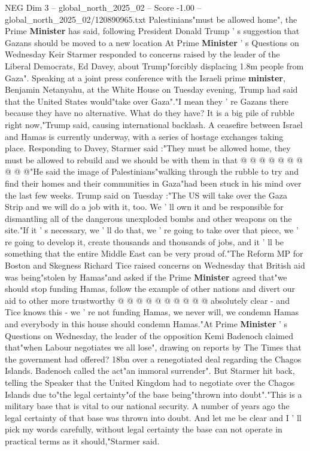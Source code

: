 \begin{textsample}{NEG Dim 3 – global\_north\_2025\_02 – Score -1.00 – global\_north\_2025\_02/120890965.txt}  \label{ex:f3_neg_168}
Palestinians"must be allowed home", the Prime \textbf{Minister} has said, following President Donald Trump ' s suggestion that Gazans should be moved to a new location At Prime \textbf{Minister} ' s Questions on Wednesday Keir Starmer responded to concerns raised by the leader of the Liberal Democrats, Ed Davey, about Trump"forcibly displacing 1.8m people from Gaza".
Speaking at a joint press conference with the Israeli prime \textbf{minister}, Benjamin Netanyahu, at the White House on Tuesday evening, Trump had said that the United States would"take over Gaza"."I mean they ' re Gazans there because they have no alternative.
What do they have?
It is a big pile of rubble right now,"Trump said, causing international backlash.
A ceasefire between Israel and Hamas is currently underway, with a series of hostage exchanges taking place.
Responding to Davey, Starmer said :"They must be allowed home, they must be allowed to rebuild and we should be with them in that @ @ @ @ @ @ @ @ @ @"He said the image of Palestinians"walking through the rubble to try and find their homes and their communities in Gaza"had been stuck in his mind over the last few weeks.
Trump said on Tuesday :"The US will take over the Gaza Strip and we will do a job with it, too.
We ' ll own it and be responsible for dismantling all of the dangerous unexploded bombs and other weapons on the site."If it ' s necessary, we ' ll do that, we ' re going to take over that piece, we ' re going to develop it, create thousands and thousands of jobs, and it ' ll be something that the entire Middle East can be very proud of."The Reform MP for Boston and Skegness Richard Tice raised concerns on Wednesday that British aid was being"stolen by Hamas"and asked if the Prime \textbf{Minister} agreed that"we should stop funding Hamas, follow the example of other nations and divert our aid to other more trustworthy @ @ @ @ @ @ @ @ @ @ absolutely clear - and Tice knows this - we ' re not funding Hamas, we never will, we condemn Hamas and everybody in this house should condemn Hamas."At Prime \textbf{Minister} ' s Questions on Wednesday, the leader of the opposition Kemi Badenoch claimed that"when Labour negotiates we all lose", drawing on reports by The Times that the government had offered? 18bn over a renegotiated deal regarding the Chagos Islands.
Badenoch called the act"an immoral surrender".
But Starmer hit back, telling the Speaker that the United Kingdom had to negotiate over the Chagos Islands due to"the legal certainty"of the base being"thrown into doubt"."This is a military base that is vital to our national security.
A number of years ago the legal certainty of that base was thrown into doubt.
And let me be clear and I ' ll pick my words carefully, without legal certainty the base can not operate in practical terms as it should,"Starmer said.

\end{textsample}
